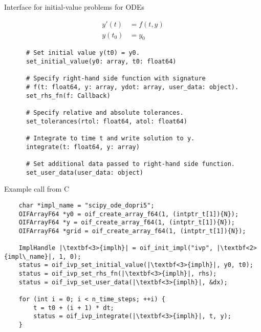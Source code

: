 \documentclass[10pt, aspectratio=169, progressbar=frametitle]{beamer}
\begin{document}
\begin{frame}[fragile]{Interface for initial-value problems for ODEs}
  \begin{minipage}{\dimexpr0.22\textwidth-2\tabcolsep}
    \begin{align*}
      y'(t)  & = f(t, y) \\
      y(t_0) & = y_0
    \end{align*}
  \end{minipage}
  \begin{minipage}{\dimexpr0.73\textwidth-2\tabcolsep}
    \begin{verbatim}
      # Set initial value y(t0) = y0.
      set_initial_value(y0: array, t0: float64)

      # Specify right-hand side function with signature
      # f(t: float64, y: array, ydot: array, user_data: object).
      set_rhs_fn(f: Callback)

      # Specify relative and absolute tolerances.
      set_tolerances(rtol: float64, atol: float64)

      # Integrate to time t and write solution to y.
      integrate(t: float64, y: array)

      # Set additional data passed to right-hand side function.
      set_user_data(user_data: object)
    \end{verbatim}
  \end{minipage}
\end{frame}

\begin{frame}[fragile]{Example call from C}
  \begin{verbatim}
    char *impl_name = "scipy_ode_dopri5";
    OIFArrayF64 *y0 = oif_create_array_f64(1, (intptr_t[1]){N});
    OIFArrayF64 *y = oif_create_array_f64(1, (intptr_t[1]){N});
    OIFArrayF64 *grid = oif_create_array_f64(1, (intptr_t[1]){N});

    ImplHandle |\textbf<3>{implh}| = oif_init_impl("ivp", |\textbf<2>{impl\_name}|, 1, 0);
    status = oif_ivp_set_initial_value(|\textbf<3>{implh}|, y0, t0);
    status = oif_ivp_set_rhs_fn(|\textbf<3>{implh}|, rhs);
    status = oif_ivp_set_user_data(|\textbf<3>{implh}|, &dx);

    for (int i = 0; i < n_time_steps; ++i) {
        t = t0 + (i + 1) * dt;
        status = oif_ivp_integrate(|\textbf<3>{implh}|, t, y);
    }
  \end{verbatim}
\end{frame}
\end{document}
